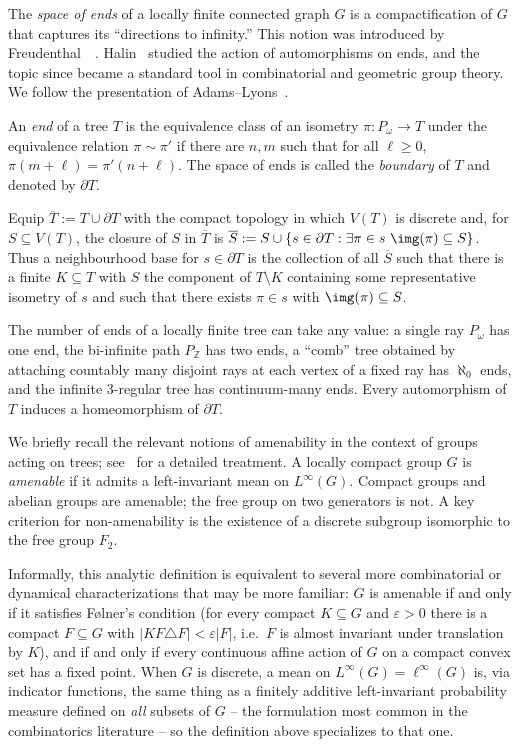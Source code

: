 The \emph{space of ends} of a locally finite connected graph $G$ is a compactification of $G$ that captures its ``directions to infinity.''
This notion was introduced by Freudenthal~\cite{Freudenthal1942}~\cite{Freudenthal1951}.
Halin~\cite{Halin_1973_AutLocallyFiniteGraphs} studied the action of automorphisms on ends, and the topic since became a standard tool in combinatorial and geometric group theory.
We follow the presentation of Adams--Lyons~\cite{AdamsLyons_1991_AmenTreesEquiv}.

\begin{definition}[Ends]\label{def:ends}
    An \emph{end} of a tree $T$ is the equivalence class of an isometry $\pi\colon P_\omega\to T$ under the equivalence relation $\pi\sim\pi'$ if there are $n,m$ such that for all $\ell\geq0$, $\pi(m+\ell)=\pi'(n+\ell)$.
    The space of ends is called the \emph{boundary} of $T$ and denoted by $\partial T$.

    Equip $\overline T:=T\cup\partial T$ with the compact topology in which $V(T)$ is discrete and, for $S\subseteq V(T)$, the closure of $S$ in $\overline T$ is $\overline S:=S\cup\{s\in\partial T : \exists\pi\in s\ \img(\pi)\subseteq S\}$.
    Thus a neighbourhood base for $s\in\partial T$ is the collection of all $\overline S$ such that there is a finite $K\subseteq T$ with $S$ the component of $T\setminus K$ containing some representative isometry of $s$ and such that there exists $\pi\in s$ with $\img(\pi)\subseteq S$.
\end{definition}

The number of ends of a locally finite tree can take any value: a single ray $P_\omega$ has one end, the bi-infinite path $P_\mathbb Z$ has two ends, a ``comb'' tree obtained by attaching countably many disjoint rays at each vertex of a fixed ray has $\aleph_0$ ends, and the infinite $3$-regular tree has continuum-many ends.
Every automorphism of $T$ induces a homeomorphism of $\partial T$.

We briefly recall the relevant notions of amenability in the context of groups acting on trees; see~\cite{Nebbia1988} for a detailed treatment.
A locally compact group $G$ is \emph{amenable} if it admits a left-invariant mean on $L^\infty(G)$.
Compact groups and abelian groups are amenable; the free group on two generators is not.
A key criterion for non-amenability is the existence of a discrete subgroup isomorphic to the free group $F_2$.

Informally, this analytic definition is equivalent to several more combinatorial or dynamical characterizations that may be more familiar: $G$ is amenable if and only if it satisfies Følner's condition (for every compact $K\subseteq G$ and $\varepsilon>0$ there is a compact $F\subseteq G$ with $|KF\triangle F|<\varepsilon|F|$, i.e.\ $F$ is almost invariant under translation by $K$), and if and only if every continuous affine action of $G$ on a compact convex set has a fixed point.
When $G$ is discrete, a mean on $L^\infty(G)=\ell^\infty(G)$ is, via indicator functions, the same thing as a finitely additive left-invariant probability measure defined on \emph{all} subsets of $G$ -- the formulation most common in the combinatorics literature -- so the definition above specializes to that one.

